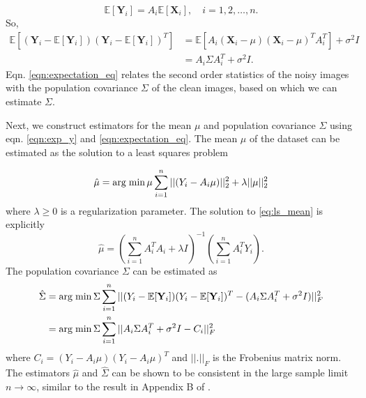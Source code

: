 \begin{equation}
\mathbb{E}[\textbf{Y}_i]=A_i \mathbb{E}[\textbf{X}_i], \quad i=1,2,\ldots,n.
\label{eqn:exp_y}
\end{equation}
So,
\begin{equation}
\begin{aligned}
\mathbb{E}[(\textbf{Y}_i-\mathbb{E}[\textbf{Y}_i])(\textbf{Y}_i-\mathbb{E}[\textbf{Y}_i])^T] 
&= \mathbb{E} [A_i(\textbf{X}_i-\mu)(\textbf{X}_i-\mu)^T A_i^T] + \sigma^2I \\
&=  A_i \Sigma A_i^T + \sigma^2I .
\end{aligned}
\label{eqn:expectation_eq}
\end{equation}
Eqn. \ref{eqn:expectation_eq} relates the second order statistics of the noisy images with the 
population covariance $\Sigma$ of the clean images, based on which we can 
estimate $\Sigma$.

Next, we construct estimators for the mean $\mu$ and population covariance 
$\Sigma$ using eqn. \ref{eqn:exp_y} and \ref{eqn:expectation_eq}.
The mean $\mu$ of the dataset can be estimated 
as the solution to
a least squares problem

\begin{equation}
 \hat\mu = \operatorname*{arg\; min}{\mu} \sum_{i=1}^n||(Y_i-A_i\mu)||_2^2 + 
\lambda||\mu||_2^2
\label{eq:ls_mean}
\end{equation}
where $\lambda \geq 0$ is a regularization parameter. The solution to 
\ref{eq:ls_mean} is explicitly
\begin{equation}
 \hat\mu = (\sum_{i=1}^n A_i^T A_i + \lambda I)^{-1}(\sum_{i=1}^n 
A_i^T Y_i).
\label{eq:ls_mean_sol}
\end{equation}
The population covariance $\Sigma$ can be estimated as 
\begin{equation}
\begin{aligned}
\hat\Sigma 
&= \operatorname*{arg\; min}{\Sigma} \sum_{i=1}^n || (Y_i - \mathbb{E}[\textbf{Y}_i]) (Y_i - \mathbb{E}[\textbf{Y}_i])^T
- (A_i \Sigma A_i^T + \sigma^2 I)||_F^2 \\
&= \operatorname*{arg\; min}{\Sigma} \sum_{i=1}^n || A_i\Sigma A_i^T + \sigma^2 I - C_i  ||_F^2 
\end{aligned}
\label{eqn:ls1}
\end{equation}
where $C_i=(Y_i - A_i \mu) (Y_i - A_i \mu)^T$ and $||.||_F$ is the Frobenius matrix norm. 
The estimators $\hat \mu$ and $\hat \Sigma$ can be shown to be consistent in the large sample limit
$n \to \infty$, similar to the result in Appendix B of \cite{Katsevich2015CovarianceME}. 

